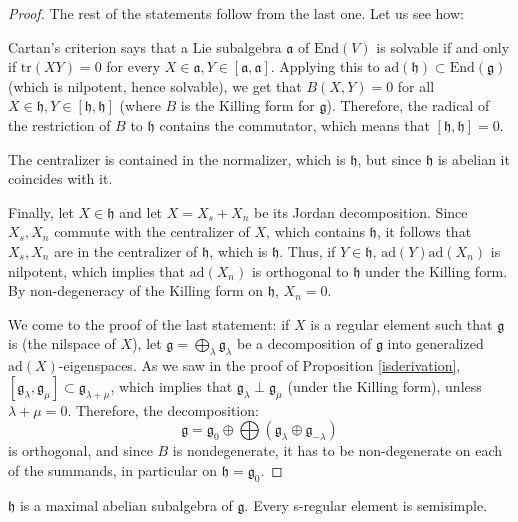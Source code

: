 \begin{proof}
 The rest of the statements follow from the last one. Let us see how: 

Cartan's criterion says that a Lie subalgebra $\mathfrak a$ of $\text{End}(V)$ is solvable if and only if $\text{tr}(XY)=0$ for every $X\in \mathfrak a, Y\in [\mathfrak a,\mathfrak a]$. Applying this to $\text{ad}(\mathfrak h)\subset \text{End}(\mathfrak g)$ (which is nilpotent, hence solvable), we get that $B(X,Y)=0$ for all $X\in \mathfrak h, Y\in[\mathfrak h,\mathfrak h]$ (where $B$ is the Killing form for $\mathfrak g$). Therefore, the radical of the restriction of $B$ to $\mathfrak h$ contains the commutator, which means that $[\mathfrak h,\mathfrak h]=0$.

The centralizer is contained in the normalizer, which is $\mathfrak h$, but since $\mathfrak h$ is abelian it coincides with it.

Finally, let $X\in\mathfrak h$ and let $X=X_s+X_n$ be its Jordan decomposition. Since $X_s, X_n$ commute with the centralizer of $X$, which contains $\mathfrak h$, it follows that $X_s, X_n$ are in the centralizer of $\mathfrak h$, which is $\mathfrak h$. Thus, if $Y\in\mathfrak h$, $\text{ad}(Y)\text{ad}(X_n)$ is nilpotent, which implies that $\text{ad}(X_n)$ is orthogonal to $\mathfrak h$ under the Killing form. By non-degeneracy of the Killing form on $\mathfrak h$, $X_n=0$.

We come to the proof of the last statement: if $X$ is a regular element such that $\mathfrak g$ is (the nilspace of $X$), let $\mathfrak g = \bigoplus_\lambda \mathfrak g_\lambda$ be a decomposition of $\mathfrak g$ into generalized $\text{ad}(X)$-eigenspaces. As we saw in the proof of Proposition \ref{isderivation}, $[\mathfrak g_\lambda,\mathfrak g_\mu]\subset \mathfrak g_{\lambda+\mu}$, which implies that $\mathfrak g_\lambda \perp \mathfrak g_\mu$ (under the Killing form), unless $\lambda+\mu=0$. Therefore, the decomposition:
$$ \mathfrak g = \mathfrak g_0 \oplus \bigoplus (\mathfrak g_{\lambda}\oplus \mathfrak g_{-\lambda})$$
is orthogonal, and since $B$ is nondegenerate, it has to be non-degenerate on each of the summands, in particular on $\mathfrak h=\mathfrak g_0$.
\end{proof}


\begin{proposition}
 $\mathfrak h$ is a maximal abelian subalgebra of $\mathfrak g$. Every s-regular element is semisimple.
\end{proposition}


